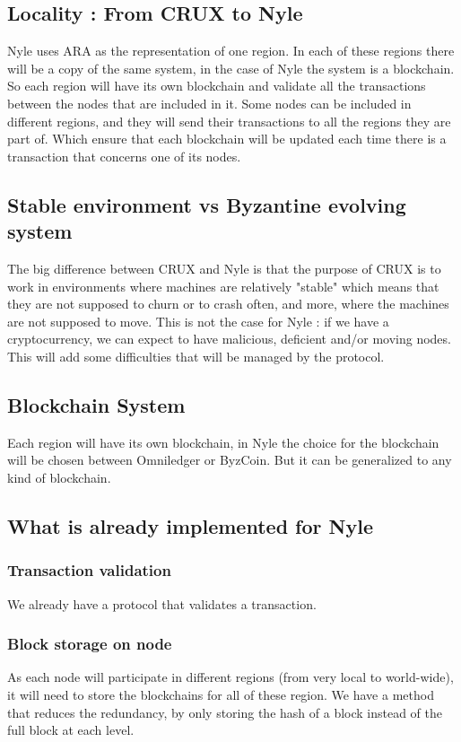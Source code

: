 \documentclass[a4paper,11pt,oneside]{report}
\begin{document}
\subsection{Locality : From CRUX to Nyle}

Nyle uses ARA as the representation of one region. In each of these regions there
will be a copy of the same system, in the case of Nyle the system is a
blockchain. So each region will have its own blockchain and validate all the
transactions between the nodes that are included in it. Some nodes can be
included in different regions, and they will send their transactions to all the
regions they are part of. Which ensure that each blockchain will be updated
each time there is a transaction that concerns one of its nodes.

\subsection{Stable environment vs Byzantine evolving system}

The big difference between CRUX and Nyle is that the purpose of CRUX is to work
in environments where machines are relatively "stable" which means that they
are not supposed to churn or to crash often, and more, where the machines are
not supposed to move. This is not the case for Nyle : if we have a
cryptocurrency, we can expect to have malicious, deficient and/or moving nodes.
This will add some difficulties that will be managed by the protocol.

\subsection{Blockchain System} \label{blockchain_subsection}

Each region will have its own blockchain, in Nyle the choice for the blockchain
will be chosen between Omniledger or ByzCoin. But it can be generalized to any
kind of blockchain.

\subsection{What is already implemented for Nyle} \subsubsection{Transaction
validation} We already have a protocol that validates a transaction.

\subsubsection{Block storage on node} As each node will participate in
different regions (from very local to world-wide), it will need to store the
blockchains for all of these region. We have a method that reduces the
redundancy, by only storing the hash of a block instead of the full block at
each level. 
\end{document}
